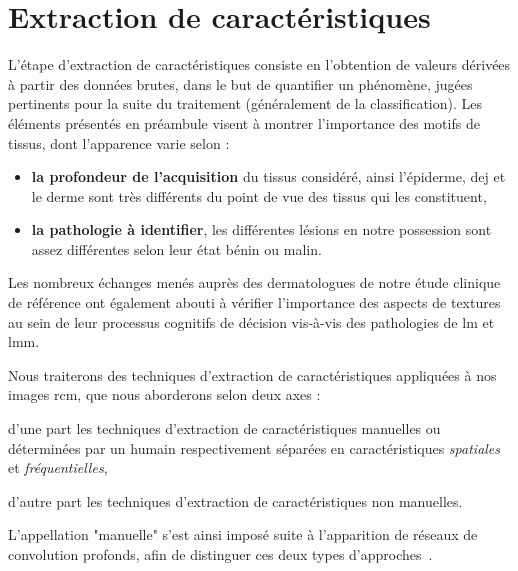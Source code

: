 \newpage

\section{Extraction de caractéristiques}
\label{chap:feature_extraction}
L'étape d'extraction de caractéristiques consiste en l'obtention de valeurs dérivées à partir des données brutes, dans le but de quantifier un phénomène, jugées pertinents pour la suite du traitement (généralement de la classification). Les éléments présentés en préambule visent à montrer l'importance des motifs de tissus, dont l'apparence varie selon :
\begin{itemize}
    \item \textbf{la profondeur de l'acquisition} du tissus considéré, ainsi l'épiderme, \gls{dej} et le derme sont très différents du point de vue des tissus qui les constituent,
    \item \textbf{la pathologie à identifier}, les différentes lésions en notre possession sont assez différentes selon leur état bénin ou malin.
\end{itemize}
Les nombreux échanges menés auprès des dermatologues de notre étude clinique de référence ont également abouti à vérifier l'importance des aspects de textures au sein de leur processus cognitifs de décision vis-à-vis des pathologies de \gls{lm} et \gls{lmm}.\par

Nous traiterons des techniques d'extraction de caractéristiques appliquées à nos images \gls{rcm}, que nous aborderons selon deux axes :
\begin{inlinerate}
    \item d'une part les techniques d'extraction de caractéristiques manuelles ou déterminées par un humain respectivement séparées en caractéristiques \textit{spatiales} et \textit{fréquentielles},
    \item d'autre part les techniques d'extraction de caractéristiques non manuelles.
\end{inlinerate} 
L'appellation "manuelle" s'est ainsi imposé suite à l'apparition de réseaux de convolution profonds, afin de distinguer ces deux types d'approches~\cite{Nanni2017}.\par

